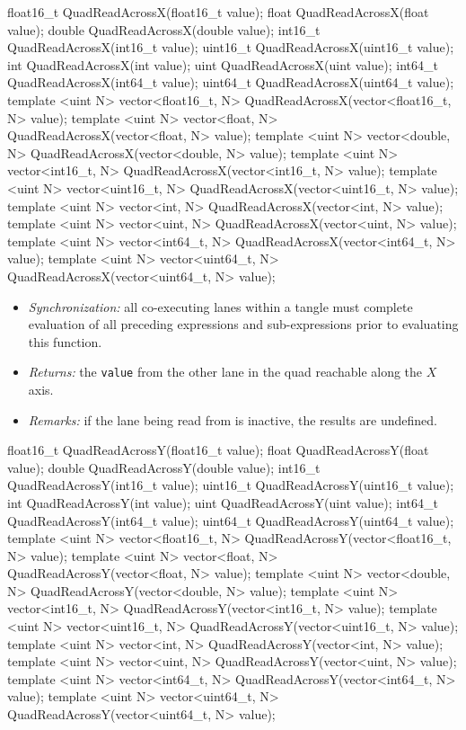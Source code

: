 \begin{HLSL}
float16_t QuadReadAcrossX(float16_t value);
float QuadReadAcrossX(float value);
double QuadReadAcrossX(double value);
int16_t QuadReadAcrossX(int16_t value);
uint16_t QuadReadAcrossX(uint16_t value);
int QuadReadAcrossX(int value);
uint QuadReadAcrossX(uint value);
int64_t QuadReadAcrossX(int64_t value);
uint64_t QuadReadAcrossX(uint64_t value);
template <uint N> vector<float16_t, N> QuadReadAcrossX(vector<float16_t, N> value);
template <uint N> vector<float, N> QuadReadAcrossX(vector<float, N> value);
template <uint N> vector<double, N> QuadReadAcrossX(vector<double, N> value);
template <uint N> vector<int16_t, N> QuadReadAcrossX(vector<int16_t, N> value);
template <uint N> vector<uint16_t, N> QuadReadAcrossX(vector<uint16_t, N> value);
template <uint N> vector<int, N> QuadReadAcrossX(vector<int, N> value);
template <uint N> vector<uint, N> QuadReadAcrossX(vector<uint, N> value);
template <uint N> vector<int64_t, N> QuadReadAcrossX(vector<int64_t, N> value);
template <uint N> vector<uint64_t, N> QuadReadAcrossX(vector<uint64_t, N> value);
\end{HLSL}

\begin{itemize}
  \item \textit{Synchronization:} all co-executing \gls{lane}s within a \gls{tangle}
  must complete evaluation of all preceding expressions and sub-expressions
  prior to evaluating this function.
  \item \textit{Returns:} the \texttt{value} from the other \gls{lane} in the
  \gls{quad} reachable along the $X$ axis.
  \item \textit{Remarks:} if the \gls{lane} being read from is inactive, the
  results are undefined.
\end{itemize}

\begin{HLSL}
float16_t QuadReadAcrossY(float16_t value);
float QuadReadAcrossY(float value);
double QuadReadAcrossY(double value);
int16_t QuadReadAcrossY(int16_t value);
uint16_t QuadReadAcrossY(uint16_t value);
int QuadReadAcrossY(int value);
uint QuadReadAcrossY(uint value);
int64_t QuadReadAcrossY(int64_t value);
uint64_t QuadReadAcrossY(uint64_t value);
template <uint N> vector<float16_t, N> QuadReadAcrossY(vector<float16_t, N> value);
template <uint N> vector<float, N> QuadReadAcrossY(vector<float, N> value);
template <uint N> vector<double, N> QuadReadAcrossY(vector<double, N> value);
template <uint N> vector<int16_t, N> QuadReadAcrossY(vector<int16_t, N> value);
template <uint N> vector<uint16_t, N> QuadReadAcrossY(vector<uint16_t, N> value);
template <uint N> vector<int, N> QuadReadAcrossY(vector<int, N> value);
template <uint N> vector<uint, N> QuadReadAcrossY(vector<uint, N> value);
template <uint N> vector<int64_t, N> QuadReadAcrossY(vector<int64_t, N> value);
template <uint N> vector<uint64_t, N> QuadReadAcrossY(vector<uint64_t, N> value);
\end{HLSL}

